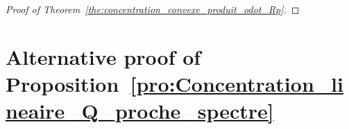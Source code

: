\documentclass{ws-rmta}
\newcommand{\un}{\mathbbm{1}}
\begin{document}
\begin{proof}[Proof of Theorem~\ref{the:concentration_convexe_produit_odot_Rp}]

\end{proof}


\section{Alternative proof of Proposition~\ref{pro:Concentration_lineaire_Q_proche_spectre}}
\end{document}
